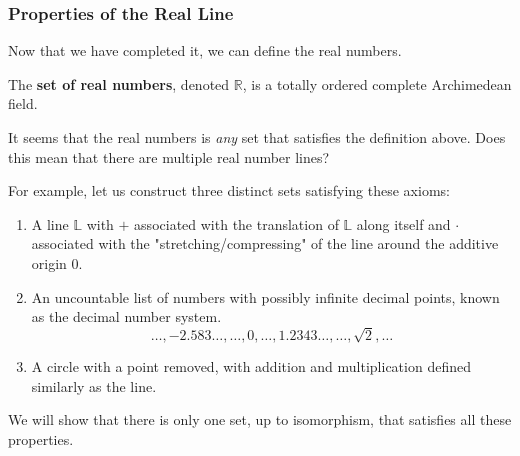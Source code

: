 \documentclass{article}
\begin{document}
    \subsubsection{Properties of the Real Line} 

      Now that we have completed it, we can define the real numbers. 

      \begin{definition}
        The \textbf{set of real numbers}, denoted $\mathbb{R}$, is a totally ordered complete Archimedean field. 
      \end{definition} 

      It seems that the real numbers is \textit{any} set that satisfies the definition above. Does this mean that there are multiple real number lines? 

      \begin{example}
        For example, let us construct three distinct sets satisfying these axioms: 
        \begin{enumerate}
          \item A line $\mathbb{L}$ with $+$ associated with the translation of $\mathbb{L}$ along itself and $\cdot$ associated with the "stretching/compressing" of the line around the additive origin $0$. 
          \item An uncountable list of numbers with possibly infinite decimal points, known as the decimal number system. 
          \begin{equation}
            \ldots, -2.583\ldots, \ldots , 0, \ldots, 1.2343\ldots, \ldots, \sqrt{2}, \ldots
          \end{equation}
          \item A circle with a point removed, with addition and multiplication defined similarly as the line. 
        \end{enumerate}
      \end{example}

      We will show that there is only one set, up to isomorphism, that satisfies all these properties. 
\end{document}
